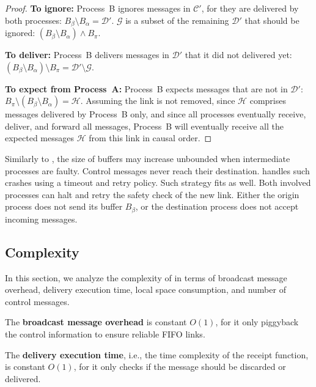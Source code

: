 \begin{proof}
  \noindent\textbf{To ignore:} Process~B ignores messages in $\mathcal{C}'$,
  for they are
  delivered by both processes: $B_\beta \setminus B_\alpha = \mathcal{D}'$.
  $\mathcal{G}$ is a subset of the remaining $\mathcal{D}'$ that should be
  ignored: $(B_\beta \setminus B_\alpha) \wedge B_\pi$.

  \noindent \textbf{To deliver:} Process~B delivers messages in $\mathcal{D}'$
  that it did not delivered yet:
  $(B_\beta\setminus B_\alpha) \setminus B_\pi = \mathcal{D}' \setminus
  \mathcal{G}$.
  
  \noindent \textbf{To expect from Process~A:} Process~B expects messages that
  are not in $\mathcal{D}'$:
  $B_\pi \setminus (B_\beta \setminus B_\alpha) = \mathcal{H}$.  Assuming the
  link is not removed, since $\mathcal{H}$ comprises messages delivered by
  Process~B only, and since all processes eventually receive, deliver, and
  forward all messages, Process~B will eventually receive all the expected
  messages $\mathcal{H}$ from this link in causal order.
\end{proof}


Similarly to \PCBROADCAST, the size of buffers may increase unbounded when
intermediate processes are faulty. Control messages never reach their
destination. \PCBROADCAST handles such crashes using a timeout and retry
policy. Such strategy fits \RPCBROADCAST as well. Both involved processes can
halt and retry the safety check of the new link. Either the origin process does
not send its buffer $B_\beta$, or the destination process does not accept
incoming messages.

\subsection{Complexity}
\label{subsec:complexity}

In this section, we analyze the complexity of \RPCBROADCAST in terms of
broadcast message overhead, delivery execution time, local space consumption,
and number of control messages. 

\noindent The \textbf{broadcast message overhead} is constant $O(1)$, for it
only piggyback the control information to ensure reliable FIFO links.

\noindent The \textbf{delivery execution time}, i.e., the time complexity of the
receipt function, is constant $O(1)$, for it only checks if the message should
be discarded or delivered. 

